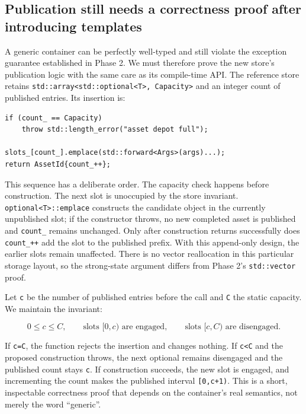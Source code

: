 \subsection{Publication still needs a correctness proof after introducing templates}\label{01-foundations-i-ch005-publication-still-needs-a-correctness-proof-after-introducing-templates}

A generic container can be perfectly well-typed and still violate the exception guarantee established in Phase 2. We must therefore prove the new store's publication logic with the same care as its compile-time API. The reference store retains \texttt{std::array\textless{}std::optional\textless{}T\textgreater{},\ Capacity\textgreater{}} and an integer count of published entries. Its insertion is:

\begin{verbatim}
if (count_ == Capacity)
    throw std::length_error("asset depot full");

slots_[count_].emplace(std::forward<Args>(args)...);
return AssetId{count_++};
\end{verbatim}

This sequence has a deliberate order. The capacity check happens before construction. The next slot is unoccupied by the store invariant. \texttt{optional\textless{}T\textgreater{}::emplace} constructs the candidate object in the currently unpublished slot; if the constructor throws, no new completed asset is published and \texttt{count\_} remains unchanged. Only after construction returns successfully does \texttt{count\_++} add the slot to the published prefix. With this append-only design, the earlier slots remain unaffected. There is no vector reallocation in this particular storage layout, so the strong-state argument differs from Phase 2's \texttt{std::vector} proof.

Let \texttt{c} be the number of published entries before the call and \texttt{C} the static capacity. We maintain the invariant:

\[
0\le c\le C,\qquad
\text{slots }[0,c)\text{ are engaged},\qquad
\text{slots }[c,C)\text{ are disengaged}.
\]

If \texttt{c=C}, the function rejects the insertion and changes nothing. If \texttt{c\textless{}C} and the proposed construction throws, the next optional remains disengaged and the published count stays \texttt{c}. If construction succeeds, the new slot is engaged, and incrementing the count makes the published interval \texttt{{[}0,c+1)}. This is a short, inspectable correctness proof that depends on the container's real semantics, not merely the word ``generic''.

